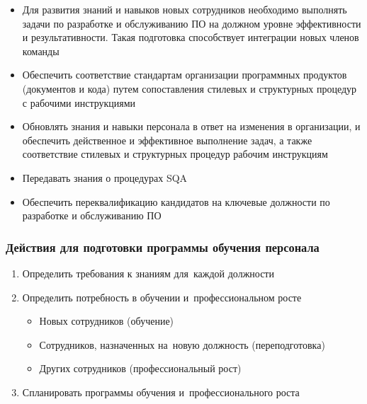 \documentclass{../industrial-development}
\begin{document}
\lecturenotes

 	 \begin{itemize}
\item Для развития знаний и навыков новых сотрудников необходимо выполнять задачи по разработке и обслуживанию ПО на должном уровне эффективности и результативности. Такая подготовка способствует интеграции новых членов команды
\item Обеспечить соответствие стандартам организации программных продуктов (документов и кода) путем сопоставления стилевых и структурных процедур с рабочими инструкциями
\item Обновлять знания и навыки персонала в ответ на изменения в организации, и обеспечить действенное и эффективное выполнение задач, а также соответствие стилевых и структурных процедур рабочим инструкциям
\item Передавать знания о процедурах SQA
\item Обеспечить переквалификацию кандидатов на ключевые должности по разработке и обслуживанию ПО~\cite[с.~337]{SQA-Galin}
  	\end{itemize}



\begin{frame} \frametitle{Действия для подготовки программы обучения персонала}
 	 \begin{enumerate}
\item Определить требования к знаниям для~каждой должности
\item Определить потребность в обучении и~профессиональном росте
		\begin{itemize}
	\item Новых сотрудников (обучение)
	\item Сотрудников, назначенных на~новую должность (переподготовка)
	\item Других сотрудников (профессиональный рост)
  		\end{itemize}
\item Спланировать программы обучения и~профессионального роста
  	\end{enumerate}
\end{frame}

\lecturenotes
\end{document}
